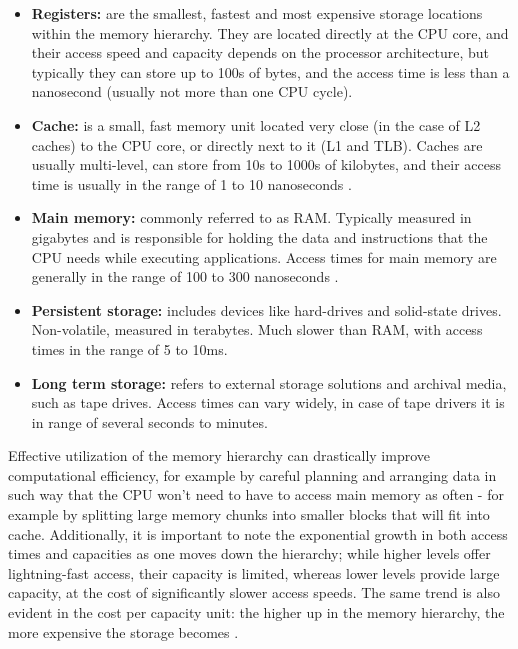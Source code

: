 \begin{itemize} %
	\item \textbf{Registers:} are the smallest, fastest and most expensive storage locations within the memory hierarchy. They are located directly at the CPU core, and their access speed and capacity depends on the processor
		architecture, but typically they can store up to 100s of bytes, and the access time is less than a nanosecond (usually not more than one CPU cycle).
	\item \textbf{Cache:} is a small, fast memory unit located very close (in the case of L2 caches) to the CPU core, or directly next to it (L1 and TLB). Caches are usually multi-level,
		can store from 10s to 1000s of kilobytes, and their access time is usually in the range of 1 to 10 nanoseconds \cite{Patterson2013}.
	\item \textbf{Main memory:} commonly referred to as RAM. Typically measured in gigabytes and is responsible for holding the data and instructions that the CPU needs while executing
		applications. Access times for main memory are generally in the range of 100 to 300 nanoseconds \cite{Hamacher2011}.
	\item \textbf{Persistent storage:} includes devices like hard-drives and solid-state drives. Non-volatile, measured in terabytes. Much slower than RAM, with access times in the range of 5 to 10ms.
	\item \textbf{Long term storage:} refers to external storage solutions and archival media, such as tape drives. Access times can vary widely, in case of tape drivers it is in range of several
		seconds to minutes.
\end{itemize}

\noindent Effective utilization of the memory hierarchy can drastically improve computational efficiency, for example by careful planning and arranging data in such way that the
CPU won't need to have to access main memory as often - for example by splitting large memory chunks into smaller blocks that will fit into cache.
Additionally, it is important to note the exponential growth in both access times and capacities as one moves down the hierarchy; while higher levels offer lightning-fast access,
their capacity is limited, whereas lower levels provide large capacity, at the cost of significantly slower access speeds. The same trend is also evident in the cost per capacity unit: the higher
up in the memory hierarchy, the more expensive the storage becomes \cite{comparchaquant}.
%

